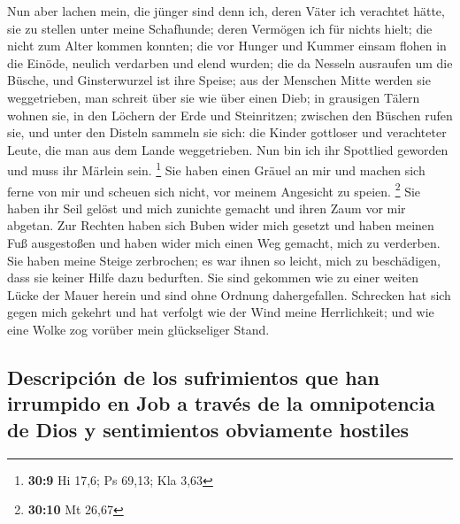  Nun aber lachen mein, die jünger sind denn ich, deren
Väter ich verachtet hätte, sie zu stellen unter meine Schafhunde;
 deren Vermögen ich für nichts hielt; die nicht zum Alter
kommen konnten;  die vor Hunger und Kummer einsam flohen
in die Einöde, neulich verdarben und elend wurden;  die da
Nesseln ausraufen um die Büsche, und Ginsterwurzel ist ihre Speise;
 aus der Menschen Mitte werden sie weggetrieben, man
schreit über sie wie über einen Dieb;  in grausigen Tälern
wohnen sie, in den Löchern der Erde und Steinritzen; 
zwischen den Büschen rufen sie, und unter den Disteln sammeln sie sich:
 die Kinder gottloser und verachteter Leute, die man aus
dem Lande weggetrieben.  Nun bin ich ihr Spottlied
geworden und muss ihr Märlein sein. \footnote{\textbf{30:9} Hi 17,6; Ps
  69,13; Kla 3,63}  Sie haben einen Gräuel an mir und
machen sich ferne von mir und scheuen sich nicht, vor meinem Angesicht
zu speien. \footnote{\textbf{30:10} Mt 26,67}  Sie haben
ihr Seil gelöst und mich zunichte gemacht und ihren Zaum vor mir
abgetan.  Zur Rechten haben sich Buben wider mich gesetzt
und haben meinen Fuß ausgestoßen und haben wider mich einen Weg gemacht,
mich zu verderben.  Sie haben meine Steige zerbrochen; es
war ihnen so leicht, mich zu beschädigen, dass sie keiner Hilfe dazu
bedurften.  Sie sind gekommen wie zu einer weiten Lücke
der Mauer herein und sind ohne Ordnung dahergefallen. 
Schrecken hat sich gegen mich gekehrt und hat verfolgt wie der Wind
meine Herrlichkeit; und wie eine Wolke zog vorüber mein glückseliger
Stand.

\hypertarget{descripciuxf3n-de-los-sufrimientos-que-han-irrumpido-en-job-a-travuxe9s-de-la-omnipotencia-de-dios-y-sentimientos-obviamente-hostiles}{%
\subsection{Descripción de los sufrimientos que han irrumpido en Job a
través de la omnipotencia de Dios y sentimientos obviamente
hostiles}\label{descripciuxf3n-de-los-sufrimientos-que-han-irrumpido-en-job-a-travuxe9s-de-la-omnipotencia-de-dios-y-sentimientos-obviamente-hostiles}}

